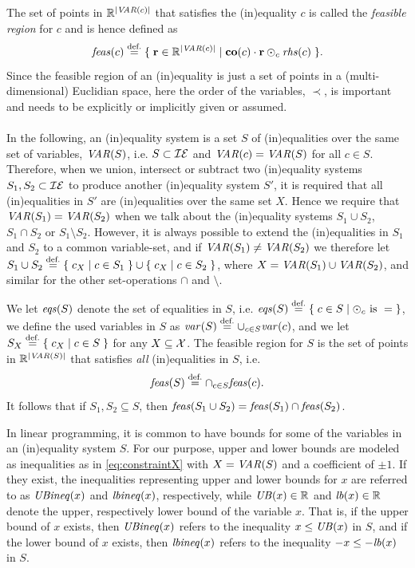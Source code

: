 The set of points in $\mathbb{R}^{|\mathit{VAR}(c)|}$ that satisfies the (in)equality $c$ is called the \emph{feasible region} for $c$ and is hence defined as
\[
\mathit{feas}(c) \overset{\text{def.}}= \{\;{\mathbf{r}\in\mathbb{R}^{|\mathit{VAR}(c)|}}\;|\;{\mathbf{co}(c)\cdot\mathbf{r}\odot_c \mathit{rhs}(c)}\;\}.
\] 
Since the feasible region of an (in)equality is just a set of points in a (multi-dimensional) Euclidian space, here the order of the variables, $\prec$, is important and needs to be explicitly or implicitly given or assumed.
\\\\
In the following, an (in)equality system is a set $S$ of (in)equalities over the same set of variables, $\mathit{VAR}(S)$, i.e. $S\subset\mathcal{IE}$ and $\mathit{VAR}(c)=\mathit{VAR}(S)$ for all $c\in S$. Therefore, when we union, intersect or subtract two (in)equality systems $S_1, S_2\subset \mathcal{IE}$ to produce another (in)equality system $S'$, it is required that all (in)equalities in $S'$ are (in)equalities over the same set $X$. Hence we require that $\mathit{VAR}(S_1) = \mathit{VAR}(S_2)$ when we talk about the (in)equality systems $S_1\cup S_2$, $S_1\cap S_2$ or $S_1\setminus S_2$. However, it is always possible to extend the (in)equalities in $S_1$ and $S_2$ to a common variable-set, and if $\mathit{VAR}(S_1)\neq \mathit{VAR}(S_2)$ we therefore let $S_1\cup S_2\overset{\text{def.}}= \{\;{c_X}\;|\;{c\in S_1}\;\}\cup \{\;{c_X}\;|\;{c\in S_2}\;\}$, where $X=\mathit{VAR}(S_1)\cup\mathit{VAR}(S_2)$, and similar for the other set-operations $\cap$ and $\setminus$. 

We let $\mathit{eqs}(S)$ denote the set of equalities in $S$, i.e. $\mathit{eqs}(S) \overset{\text{def.}}= \{\;{c \in S}\;|\;{\odot_c \text{ is } =}\;\}$, we define the used variables in $S$ as
$\mathit{var}(S)\overset{\text{def.}}= \cup_{c\in S}\mathit{var}(c)$, and we let $S_X \overset{\text{def.}}= \{\;{c_X}\;|\;{c\in S}\;\}$ for any $X\subseteq \mathcal{X}$.
The feasible region for $S$ is the set of points in $\mathbb{R}^{|\mathit{VAR}(S)|}$ that satisfies \emph{all} (in)equalities in $S$, i.e. 
\[
\mathit{feas}(S) \overset{\text{def.}}= \cap_{c\in S}\mathit{feas}(c).
\]
It follows that if $S_1, S_2\subseteq S$, then $\mathit{feas}(S_1\cup S_2) = \mathit{feas}(S_1)\cap \mathit{feas}(S_2)$. 

In linear programming, it is common to have bounds for some of the variables in an (in)equality system $S$. For our purpose, upper and lower bounds are modeled as inequalities as in \eqref{eq:constraintX} with $X=\mathit{VAR}(S)$ and a coefficient of $\pm 1$. If they exist, the inequalities representing upper and lower bounds for $x$ are referred to as $\mathit{UBineq}(x)$ and $\mathit{lbineq}(x)$, respectively, while $\mathit{UB}(x)\in \mathbb{R}$ and $\mathit{lb}(x)\in\mathbb{R}$ denote the upper, respectively lower bound of the variable $x$. 
That is, if the upper bound of $x$ exists, then $\mathit{UBineq}(x)$ refers to the inequality $x\leq \mathit{UB}(x)$ in $S$, and if the lower bound of $x$ exists, then $\mathit{lbineq}(x)$ refers to the inequality $-x \leq -\mathit{lb}(x)$ in $S$.

